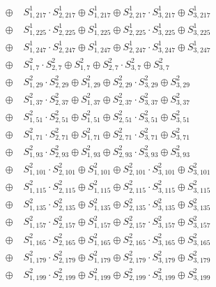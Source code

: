 \begin{align*}
\oplus\; & S^1_{1,217} \cdot S^1_{2,217} \oplus S^1_{1,217} \oplus S^1_{2,217} \cdot S^1_{3,217} \oplus S^1_{3,217}\tag*{weight 1}\\
\oplus\; & S^1_{1,225} \cdot S^1_{2,225} \oplus S^1_{1,225} \oplus S^1_{2,225} \cdot S^1_{3,225} \oplus S^1_{3,225}\tag*{weight 1}\\
\oplus\; & S^1_{1,247} \cdot S^1_{2,247} \oplus S^1_{1,247} \oplus S^1_{2,247} \cdot S^1_{3,247} \oplus S^1_{3,247}\tag*{weight 1}\\
\oplus\; & S^2_{1,7} \cdot S^2_{2,7} \oplus S^2_{1,7} \oplus S^2_{2,7} \cdot S^2_{3,7} \oplus S^2_{3,7}\tag*{weight 1}\\
\oplus\; & S^2_{1,29} \cdot S^2_{2,29} \oplus S^2_{1,29} \oplus S^2_{2,29} \cdot S^2_{3,29} \oplus S^2_{3,29}\tag*{weight 1}\\
\oplus\; & S^2_{1,37} \cdot S^2_{2,37} \oplus S^2_{1,37} \oplus S^2_{2,37} \cdot S^2_{3,37} \oplus S^2_{3,37}\tag*{weight 1}\\
\oplus\; & S^2_{1,51} \cdot S^2_{2,51} \oplus S^2_{1,51} \oplus S^2_{2,51} \cdot S^2_{3,51} \oplus S^2_{3,51}\tag*{weight 1}\\
\oplus\; & S^2_{1,71} \cdot S^2_{2,71} \oplus S^2_{1,71} \oplus S^2_{2,71} \cdot S^2_{3,71} \oplus S^2_{3,71}\tag*{weight 1}\\
\oplus\; & S^2_{1,93} \cdot S^2_{2,93} \oplus S^2_{1,93} \oplus S^2_{2,93} \cdot S^2_{3,93} \oplus S^2_{3,93}\tag*{weight 1}\\
\oplus\; & S^2_{1,101} \cdot S^2_{2,101} \oplus S^2_{1,101} \oplus S^2_{2,101} \cdot S^2_{3,101} \oplus S^2_{3,101}\tag*{weight 1}\\
\oplus\; & S^2_{1,115} \cdot S^2_{2,115} \oplus S^2_{1,115} \oplus S^2_{2,115} \cdot S^2_{3,115} \oplus S^2_{3,115}\tag*{weight 1}\\
\oplus\; & S^2_{1,135} \cdot S^2_{2,135} \oplus S^2_{1,135} \oplus S^2_{2,135} \cdot S^2_{3,135} \oplus S^2_{3,135}\tag*{weight 1}\\
\oplus\; & S^2_{1,157} \cdot S^2_{2,157} \oplus S^2_{1,157} \oplus S^2_{2,157} \cdot S^2_{3,157} \oplus S^2_{3,157}\tag*{weight 1}\\
\oplus\; & S^2_{1,165} \cdot S^2_{2,165} \oplus S^2_{1,165} \oplus S^2_{2,165} \cdot S^2_{3,165} \oplus S^2_{3,165}\tag*{weight 1}\\
\oplus\; & S^2_{1,179} \cdot S^2_{2,179} \oplus S^2_{1,179} \oplus S^2_{2,179} \cdot S^2_{3,179} \oplus S^2_{3,179}\tag*{weight 1}\\
\oplus\; & S^2_{1,199} \cdot S^2_{2,199} \oplus S^2_{1,199} \oplus S^2_{2,199} \cdot S^2_{3,199} \oplus S^2_{3,199}\tag*{weight 1}\\

\end{align*}
